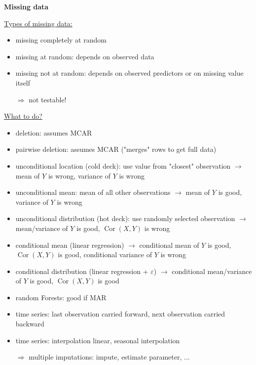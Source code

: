 \documentclass[10pt,landscape,a4paper]{article}
\DeclareMathOperator{\Cor}{Cor}
\begin{document}
\begin{multicols*}{4}
\begin{center}
	\normalsize{\textbf{Missing data}} \\
\end{center}
\underline{Types of missing data:}
\begin{itemize}
	\item missing completely at random
	\item missing at random: depends on observed data
	\item missing not at random: depends on observed predictors or on missing value itself
	\item[$\Rightarrow$] not testable!
\end{itemize}
\underline{What to do?}
\begin{itemize}
	\item deletion: assumes MCAR
	\item pairwise deletion: assumes MCAR ("merges" rows to get full data)
	\item unconditional location (cold deck): use value from "closest" observation $\to$ mean of $Y$ is wrong, variance of $Y$ is wrong
	\item unconditional mean: mean of all other observations $\to$ mean of $Y$ is good, variance of $Y$ is wrong
	\item unconditional distribution (hot deck): use randomly selected observation $\to$ mean/variance of $Y$ is good, $\Cor(X,Y)$ is wrong
	\item conditional mean (linear regression) $\to$ conditional mean of $Y$ is good, $\Cor(X,Y)$ is good, conditional variance of $Y$ is wrong
	\item conditional distribution (linear regression + $\varepsilon$) $\to$ conditional mean/variance of $Y$ is good, $\Cor(X,Y)$ is good
	\item random Forests: good if MAR
	\item time series: last observation carried forward, next observation carried backward
	\item time series: interpolation linear, seasonal interpolation
	\item[$\Rightarrow$] multiple imputations: impute, estimate parameter, ...
\end{itemize}


\end{multicols*}
\end{document}
